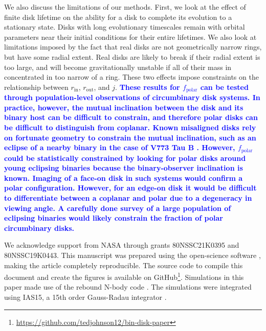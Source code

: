 \documentclass[twocolumn,linenumbers]{aastex631}
\newcommand\ghurl[0]{\url{https://github.com/tedjohnson12/bin-disk-paper}}
\newcommand{\RR}[1]{\textcolor{blue}{\bf#1}} %
\begin{document}
We also discuss the limitations of our methods. First, we look at the effect of finite disk lifetime on the ability for a disk to complete its evolution to a stationary state. Disks with long evolutionary timescales remain with orbital parameters near their initial conditions for their entire lifetimes. We also look at limitations imposed by the fact that real disks are not geometrically narrow rings, but have some radial extent. Real disks are likely to break if their radial extent is too large, and will become gravitationally unstable if all of their mass in concentrated in too narrow of a ring. These two effects impose constraints on the relationship between $r_\text{in}$, $r_\text{out}$, and $j$.
\RR{
These results for $f_\text{polar}$ can be tested through population-level observations of circumbinary disk systems. In practice, however, the mutual inclination between the disk and its binary host can be difficult to constrain, and therefore polar disks can be difficult to distinguish from coplanar. Known misaligned disks rely on fortunate geometry to constrain the mutual inclination, such as an eclipse of a nearby binary in the case of V773 Tau B \citep{kenworthy2022}. However, $f_\text{polar}$ could be statistically constrained by looking for polar disks around young eclipsing binaries because the binary-observer inclination is known. Imaging of a face-on disk in such systems would confirm a polar configuration. However, for an edge-on disk it would be difficult to differentiate between a coplanar and polar due to a degeneracy in viewing angle. A carefully done survey of a large population of eclipsing binaries \citep[e.g., those found by the Kepler Mission][]{kirk2016} would likely constrain the fraction of polar circumbinary disks.
}


\begin{acknowledgements}
\label{sec:ack}

We acknowledge support from NASA through grants 80NSSC21K0395 and 80NSSC19K0443. This manuscript was prepared using the open-science software \href{https://show-your.work/en/latest/intro/}{\showyourwork} \citep{luger2021}, making the article completely
reproducible. The source code to compile this document and create the figures is available on GitHub\footnote{\ghurl}.
Simulations in this paper made use of the {\sc rebound} N-body code \citep{rebound}.
The simulations were integrated using IAS15, a 15th order Gauss-Radau integrator \citep{reboundias15}. 

\end{acknowledgements}


\end{document}
